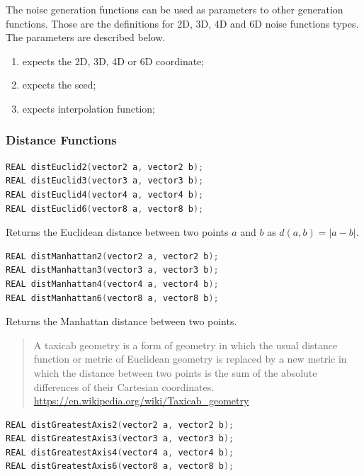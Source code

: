 The noise generation functions can be used as parameters to other generation
functions. Those are the definitions for 2D, 3D, 4D and 6D noise functions types.
The parameters are described below.

\begin{enumerate}
\item expects the 2D, 3D, 4D or 6D coordinate;
\item expects the seed;
\item expects interpolation function;
\end{enumerate}

\subsubsection{Distance Functions}

\begin{lstlisting}[caption={Definition of Euclid distance functions},label={lst:distance_euclid_functions},language=OpenCL]
REAL distEuclid2(vector2 a, vector2 b);
REAL distEuclid3(vector3 a, vector3 b);
REAL distEuclid4(vector4 a, vector4 b);
REAL distEuclid6(vector8 a, vector8 b);
\end{lstlisting}

Returns the Euclidean distance between two points $a$ and $b$ as $d(a,b) = |a-b|$.

\begin{lstlisting}[caption={Definition of Manhattan distance functions},label={lst:distance_manhattan_functions},language=OpenCL]
REAL distManhattan2(vector2 a, vector2 b);
REAL distManhattan3(vector3 a, vector3 b);
REAL distManhattan4(vector4 a, vector4 b);
REAL distManhattan6(vector8 a, vector8 b);
\end{lstlisting}

Returns the Manhattan distance between two points.

\begin{quote}
A taxicab geometry is a form of geometry in which the usual distance function or metric of Euclidean geometry is replaced by a new metric in which the distance between two points is the sum of the absolute differences of their Cartesian coordinates.
\url{https://en.wikipedia.org/wiki/Taxicab_geometry}
\end{quote}

\begin{lstlisting}[caption={Definition of greatest axis distance functions},label={lst:distance_greatest_axis_functions},language=OpenCL]
REAL distGreatestAxis2(vector2 a, vector2 b);
REAL distGreatestAxis3(vector3 a, vector3 b);
REAL distGreatestAxis4(vector4 a, vector4 b);
REAL distGreatestAxis6(vector8 a, vector8 b);
\end{lstlisting}

